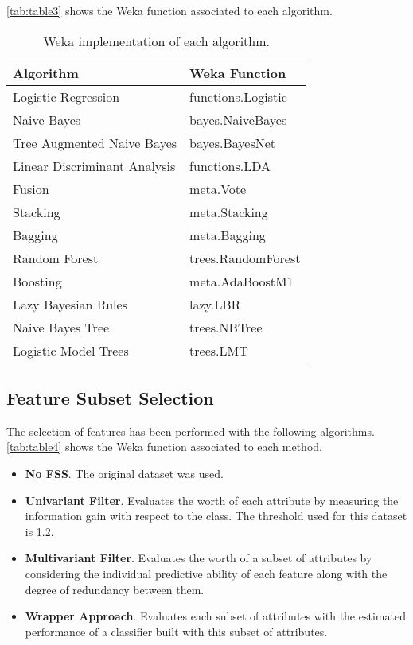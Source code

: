 \documentclass[a4paper,11pt]{article}
\begin{document}
\autoref{tab:table3} shows the Weka function associated to each algorithm.

\begin{table}[h]
\centering
\begin{tabular}{||l|l||}
	\hline
	Algorithm & Weka Function\\
	\hline
	Logistic Regression & functions.Logistic\\
	Naive Bayes & bayes.NaiveBayes\\
	Tree Augmented Naive Bayes & bayes.BayesNet\\
	Linear Discriminant Analysis & functions.LDA\\
	\hline
	Fusion & meta.Vote \\
	Stacking & meta.Stacking\\
	Bagging & meta.Bagging\\
	Random Forest & trees.RandomForest\\
	Boosting & meta.AdaBoostM1\\
	Lazy Bayesian Rules & lazy.LBR\\
	Naive Bayes Tree & trees.NBTree\\
	Logistic Model Trees & trees.LMT\\
	\hline
\end{tabular}
\caption{Weka implementation of each algorithm.}
\label{tab:table3}
\end{table}

\subsection{Feature Subset Selection}
\label{subsec:fss}

The selection of features has been performed with the following algorithms. \autoref{tab:table4} shows the Weka function associated to each method.

\begin{itemize}
\setlength\itemsep{-1ex}
\item \textbf{No FSS}. The original dataset was used.
\item \textbf{Univariant Filter}. Evaluates the worth of each attribute by measuring the information gain with respect to the class. The threshold used for this dataset is 1.2.
\item \textbf{Multivariant Filter}. Evaluates the worth of a subset of attributes by considering the individual predictive ability of each feature along with the degree of redundancy between them.
\item \textbf{Wrapper Approach}. Evaluates each subset of attributes with the estimated performance of a classifier built with this subset of attributes.
\end{itemize}
\end{document}
